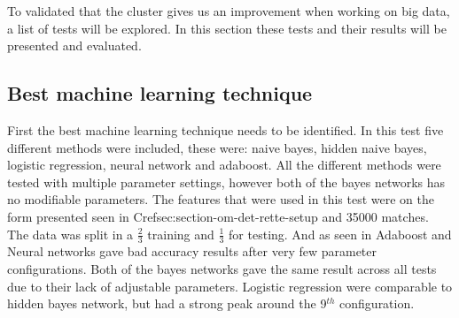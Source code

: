 To validated that the cluster gives us an improvement when working on big data, a list of tests will be explored. In this section these tests and their results will be presented and evaluated.

\subsection{Best machine learning technique}
\usetikzlibrary{arrows,intersections}
First the best machine learning technique needs to be identified. In this test five different methods were included, these were: naive bayes, hidden naive bayes, logistic regression, neural network and adaboost. All the different methods were tested with multiple parameter settings, however both of the bayes networks has no modifiable parameters. The features that were used in this test were on the form presented seen in Cref{sec:section-om-det-rette-setup} and 35000 matches. The data was split in a $\frac{2}{3}$ training and $\frac{1}{3}$ for testing. And as seen in  Adaboost and Neural networks gave bad accuracy results after very few parameter configurations. Both of the bayes networks gave the same result across all tests due to their lack of adjustable parameters. Logistic regression were comparable to hidden bayes network, but had a strong peak around the 9$^{th}$ configuration.

